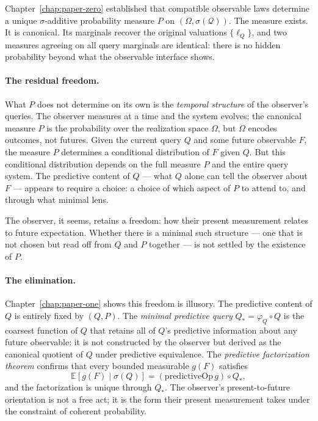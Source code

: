 
Chapter~\ref{chap:paper-zero} established that compatible observable
laws determine a unique $\sigma$-additive probability measure $P$ on
$(\Omega, \sigma(\mathcal{Q}))$.  The measure exists.  It is canonical.
Its marginals recover the original valuations $\{\ell_Q\}$, and two
measures agreeing on all query marginals are identical: there is no
hidden probability beyond what the observable interface shows.

\medskip

\paragraph{The residual freedom.}
What $P$ does not determine on its own is the \emph{temporal structure}
of the observer's queries.  The observer measures at a time and the
system evolves; the canonical measure $P$ is the probability over the
realization space $\Omega$, but $\Omega$ encodes outcomes, not futures.
Given the current query $Q$ and some future observable $F$, the measure
$P$ determines a conditional distribution of $F$ given $Q$.  But this
conditional distribution depends on the full measure $P$ and the entire
query system.  The predictive content of $Q$ --- what $Q$ alone can
tell the observer about $F$ --- appears to require a choice: a choice
of which aspect of $P$ to attend to, and through what minimal lens.

The observer, it seems, retains a freedom: how their present measurement
relates to future expectation.  Whether there is a minimal such structure
--- one that is not chosen but read off from $Q$ and $P$ together ---
is not settled by the existence of $P$.

\medskip

\paragraph{The elimination.}
Chapter~\ref{chap:paper-one} shows this freedom is illusory.  The
predictive content of $Q$ is entirely fixed by $(Q, P)$.  The
\emph{minimal predictive query} $Q_* = \varphi_Q \circ Q$ is the
coarsest function of $Q$ that retains all of $Q$'s predictive
information about any future observable: it is not constructed by
the observer but derived as the canonical quotient of $Q$ under
predictive equivalence.  The \emph{predictive factorization theorem}
confirms that every bounded measurable $g(F)$ satisfies
\[
  \mathbb{E}[g(F) \mid \sigma(Q)] = (\mathrm{predictiveOp}\,g) \circ Q_*,
\]
and the factorization is unique through $Q_*$.  The observer's
present-to-future orientation is not a free act; it is the form
their present measurement takes under the constraint of coherent
probability.

